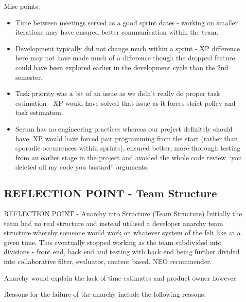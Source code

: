 \documentclass{l3proj}
\begin{document}
Misc points:
\begin{itemize}
\item Time between meetings served as a good sprint dates - working on smaller iterations may have ensured better communication within the team.
\item Development typically did not change much within a sprint - XP difference here may not have made much of a difference though the dropped feature could have been explored earlier in the development cycle than the 2nd semester.
\item Task priority was a bit of an issue as we didn’t really do proper task estimation - XP would have solved that issue as it forces strict policy and task estimation.
\item Scrum has no engineering practices whereas our project definitely should have. XP would have forced pair programming from the start (rather than sporadic occurrences within sprints), ensured better, more thorough testing from an earlier stage in the project and avoided the whole code review “you deleted all my code you bastard” arguments.
\end{itemize}



\subsection{REFLECTION POINT - Team Structure}
\label{sec:teamstructure}

REFLECTION POINT - Anarchy into Structure (Team Structure)
Initially the team had no real structure and instead utilised a developer anarchy team structure whereby someone would work on whatever system of the felt like at a given time. This eventually stopped working as the team subdivided into divisions - front end, back end and testing with back end being further divided into collaborative filter, evaluator, content based, NEO recommender.

Anarchy would explain the lack of time estimates and product owner however.

Reasons for the failure of the anarchy include the following reasons:
\end{document}
